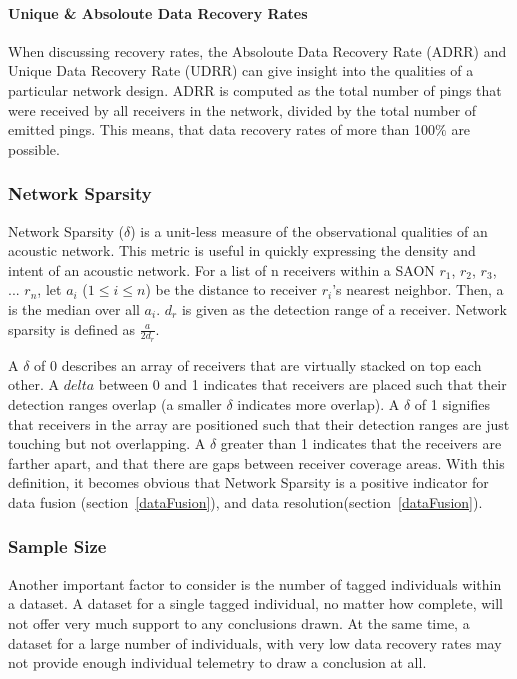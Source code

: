 \paragraph{Unique \& Absoloute Data Recovery Rates}
When discussing recovery rates, the Absoloute Data Recovery Rate (ADRR) and Unique Data Recovery Rate (UDRR) can give insight into the qualities of a particular network design.  ADRR is computed as the total number of pings that were received by all receivers in the network, divided by the total number of emitted pings.  This means, that data recovery rates of more than 100$\%$ are possible.  

\subsubsection{Network Sparsity}
\label{delta}
Network Sparsity ($\delta$) is a unit-less measure of the observational qualities of an acoustic network.  This metric is useful in quickly expressing the density and intent of an acoustic network.  For a list of n receivers within a SAON $r_1$, $r_2$, $r_3$, ... $r_n$, let $a_i$ ($1\le i \le n$) be the distance to receiver $r_i$'s nearest neighbor.  Then, a is the median over all $a_i$.  $d_r$ is given as the detection range of a receiver.  Network sparsity is defined as $\frac{a}{2d_r}$.  

A $\delta$ of 0 describes an array of receivers that are virtually stacked on top each other.  A $delta$ between 0 and 1 indicates that receivers are placed such that their detection ranges overlap (a smaller $\delta$ indicates more overlap).  A $\delta$ of 1 signifies that receivers in the array are positioned such that their detection ranges are just touching but not overlapping.  A $\delta$ greater than 1 indicates that the receivers are farther apart, and that there are gaps between receiver coverage areas.  
With this definition, it becomes obvious that Network Sparsity is a positive indicator for data
fusion (section~\ref{dataFusion}), and data resolution(section~\ref{dataFusion}).


\subsubsection{Sample Size}
\label{sampleSize}
Another important factor to consider is the number of tagged individuals within a dataset.  A dataset for a single tagged individual, no matter how complete, will not offer very much support to any conclusions drawn.  At the same time, a dataset for a large number of individuals, with very low data recovery rates may not provide enough individual telemetry to draw a conclusion at all.

